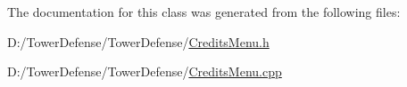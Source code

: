 The documentation for this class was generated from the following files\+:\begin{DoxyCompactItemize}
\item 
D\+:/\+Tower\+Defense/\+Tower\+Defense/\hyperlink{_credits_menu_8h}{Credits\+Menu.\+h}\item 
D\+:/\+Tower\+Defense/\+Tower\+Defense/\hyperlink{_credits_menu_8cpp}{Credits\+Menu.\+cpp}\end{DoxyCompactItemize}
